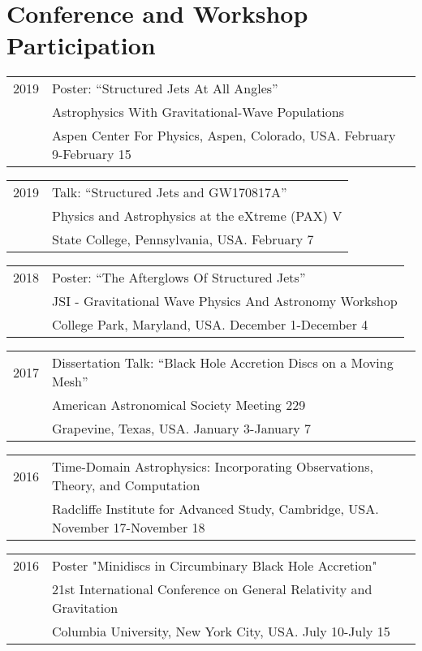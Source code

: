 \documentclass[letterpaper]{article}
\renewenvironment{itemize}{
  \begin{list}{}{
    \setlength{\leftmargin}{1.5em}
  }
}{
  \end{list}
}
\begin{document}
\section*{Conference and Workshop Participation}
\begin{itemize}

\item \begin{tabular}{ll}
2019 & Poster: ``Structured Jets At All Angles'' \\
	 &  Astrophysics With Gravitational-Wave Populations \\
	 &  Aspen Center For Physics, Aspen, Colorado, USA. February 9-February 15
\end{tabular}

\item \begin{tabular}{ll}
2019 & Talk: ``Structured Jets and GW170817A'' \\
	 & Physics and Astrophysics at the eXtreme (PAX) V \\
	 & State College, Pennsylvania, USA. February 7
\end{tabular}

\item \begin{tabular}{ll}
2018 & Poster: ``The Afterglows Of Structured Jets'' \\
	 & JSI - Gravitational Wave Physics And Astronomy Workshop \\
	 & College Park, Maryland, USA. December 1-December 4
\end{tabular}

\item \begin{tabular}{ll}
2017 & Dissertation Talk: ``Black Hole Accretion Discs on a Moving Mesh'' \\
	 & American Astronomical Society Meeting 229 \\
	 & Grapevine, Texas, USA. January 3-January 7
\end{tabular}
\item \begin{tabular}{ll}
2016 & Time-Domain Astrophysics: Incorporating Observations, Theory, and Computation \\
	 & Radcliffe Institute for Advanced Study, Cambridge, USA. November 17-November 18
\end{tabular}
\item \begin{tabular}{ll}
2016 & Poster "Minidiscs in Circumbinary Black Hole Accretion" \\
	& 21st International Conference on General Relativity and Gravitation \\ 
	& Columbia University, New York City, USA. July 10-July 15
\end{tabular}


\end{itemize}
\end{document}
